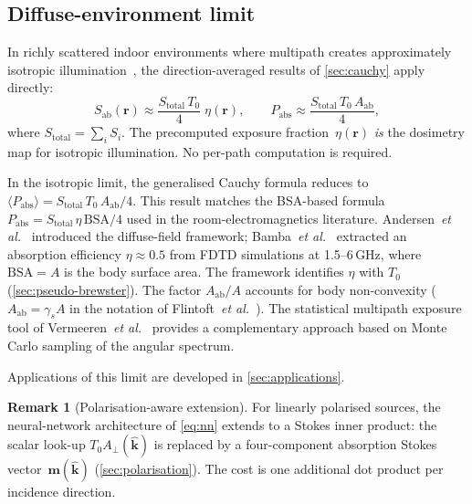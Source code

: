 \documentclass[11pt,a4paper]{article}
\theoremstyle{definition}      %
\newtheorem{remark}[remark]{Remark}
\newcommand{\khat}{\hat{\bm{k}}}
\newcommand{\rr}{\mathbf{r}}
\newcommand{\Sab}{S_{\mathrm{ab}}}
\newcommand{\Aab}{A_{\mathrm{ab}}}
\newcommand{\Aperp}{A_{\perp}}
\begin{document}
\subsection{Diffuse-environment limit}\label{sec:diffuse-limit}

In richly scattered indoor environments where multipath creates
approximately isotropic illumination~\cite{Andersen2007}, the
direction-averaged results of \cref{sec:cauchy} apply directly:
\begin{equation}\label{eq:diffuse}
  \Sab(\rr) \approx \frac{S_{\mathrm{total}}\,T_0}{4}\;\eta(\rr),
  \qquad
  P_{\mathrm{abs}} \approx
  \frac{S_{\mathrm{total}}\,T_0\,\Aab}{4},
\end{equation}
where $S_{\mathrm{total}}=\sum_i S_i$.  The precomputed exposure
fraction~$\eta(\rr)$ \emph{is} the dosimetry map for isotropic
illumination.  No per-path computation is required.

In the isotropic limit, the generalised Cauchy formula reduces to
$\langle P_{\mathrm{abs}}\rangle = S_{\mathrm{total}}\,T_0\,\Aab/4$.
This result matches the BSA-based formula
$P_{\mathrm{abs}} = S_{\mathrm{total}}\,\eta\,\mathrm{BSA}/4$
used in the room-electromagnetics literature.
Andersen~\textit{et al.}~\cite{Andersen2007} introduced the diffuse-field
framework; Bamba~\textit{et al.}~\cite{Bamba2014} extracted
an absorption efficiency $\eta \approx 0.5$ from FDTD simulations at
1.5--6\,GHz, where $\mathrm{BSA} = A$ is the body surface area.
The framework identifies $\eta$ with $T_0$ (\cref{sec:pseudo-brewster}).
The factor $\Aab/A$ accounts for body non-convexity ($\Aab = \gamma_s A$
in the notation of Flintoft~\textit{et al.}~\cite{Flintoft2014}).
The statistical multipath exposure tool of
Vermeeren~\textit{et al.}~\cite{Vermeeren2008} provides a complementary
approach based on Monte Carlo sampling of the angular spectrum.

Applications of this limit are developed in \cref{sec:applications}.

\begin{remark}[Polarisation-aware extension]
For linearly polarised sources, the neural-network architecture of
\cref{eq:nn} extends to a Stokes inner product: the scalar look-up
$T_0\Aperp(\khat)$ is replaced by a four-component absorption Stokes
vector~$\mathbf{m}(\khat)$ (\cref{sec:polarisation}).  The cost is
one additional dot product per incidence direction.
\end{remark}


\end{document}
